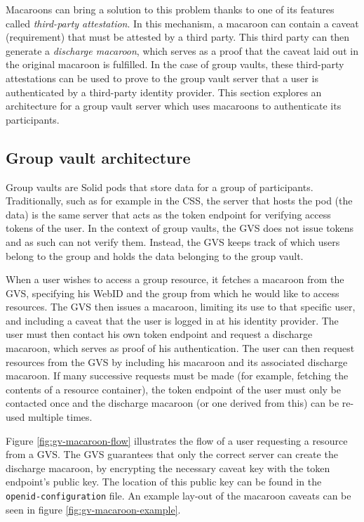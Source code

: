 \noindent Macaroons \citep{macaroons} can bring a solution to this problem thanks to one of its features called \textit{third-party attestation}. In this mechanism, a macaroon can contain a caveat (requirement) that must be attested by a third party. This third party can then generate a \textit{discharge macaroon}, which serves as a proof that the caveat laid out in the original macaroon is fulfilled. In the case of group vaults, these third-party attestations can be used to prove to the group vault server that a user is authenticated by a third-party identity provider. This section explores an architecture for a group vault server which uses macaroons to authenticate its participants.

\subsection{Group vault architecture}
Group vaults are Solid pods that store data for a group of participants. Traditionally, such as for example in the \acrlong{CSS}, the server that hosts the pod (the data) is the same server that acts as the token endpoint for verifying access tokens of the user. In the context of group vaults, the \gls{GVS} does not issue tokens and as such can not verify them. Instead, the \gls{GVS} keeps track of which users belong to the group and holds the data belonging to the group vault.

When a user wishes to access a group resource, it fetches a macaroon from the \gls{GVS}, specifying his WebID and the group from which he would like to access resources. The \gls{GVS} then issues a macaroon, limiting its use to that specific user, and including a caveat that the user is logged in at his identity provider. The user must then contact his own token endpoint and request a discharge macaroon, which serves as proof of his authentication. The user can then request resources from the \gls{GVS} by including his macaroon and its associated discharge macaroon. If many successive requests must be made (for example, fetching the contents of a resource container), the token endpoint of the user must only be contacted once and the discharge macaroon (or one derived from this) can be re-used multiple times. 

Figure \ref{fig:gv-macaroon-flow} illustrates the flow of a user requesting a resource from a \gls{GVS}. The \gls{GVS} guarantees that only the correct server can create the discharge macaroon, by encrypting the necessary caveat key with the token endpoint's public key. The location of this public key can be found in the \texttt{openid-configuration} file. An example lay-out of the macaroon caveats can be seen in figure \ref{fig:gv-macaroon-example}.

